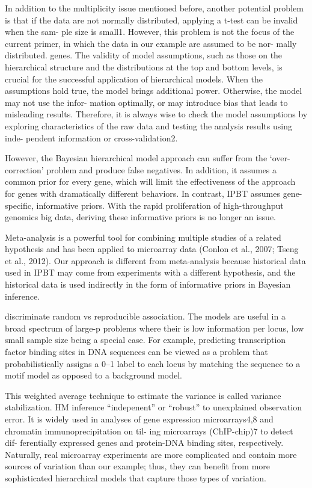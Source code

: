 \documentclass{article}
\begin{document}
In addition to the multiplicity issue mentioned before, another potential problem is that if the data are not normally distributed, applying a t-test can be invalid when the sam- ple size is small1. However, this problem is not the focus of the current primer, in which the data in our example are assumed to be nor- mally distributed.
genes. The validity of model assumptions, such as those on the hierarchical structure and the distributions at the top and bottom levels, is crucial for the successful application of hierarchical models. When the assumptions hold true, the model brings additional power. Otherwise, the model may not use the infor- mation optimally, or may introduce bias that leads to misleading results. Therefore, it is always wise to check the model assumptions by exploring characteristics of the raw data and testing the analysis results using inde- pendent information or cross-validation2.

However, the Bayesian hierarchical model approach can suffer from the ‘over-correction’ problem and produce false negatives. In addition, it assumes a common prior for every gene, which will limit the effectiveness of the approach for genes with dramatically different behaviors. In contrast, IPBT assumes gene-specific, informative priors. With the rapid proliferation of high-throughput genomics big data, deriving these informative priors is no longer an issue.

Meta-analysis is a powerful tool for combining multiple studies of a related hypothesis and has been applied to microarray data (Conlon et al., 2007; Tseng et al., 2012). Our approach is different from meta-analysis because historical data used in IPBT may come from experiments with a different hypothesis, and the historical data is used indirectly in the form of informative priors in Bayesian inference.

discriminate random vs reproducible association.
The models are useful in a broad spectrum of large-p problems where their is low information per locus, low small sample size being a special case. For example, predicting transcription factor binding sites in DNA sequences can be viewed as a problem that probabilistically assigns a 0–1 label to each locus by matching the sequence to a motif model as opposed to a background model.

This weighted average technique to estimate the variance is called variance stabilization. HM inference ``indepenent'' or ``robust'' to unexplained observation error. It is widely used in analyses of gene expression microarrays4,8 and chromatin immunoprecipitation on til- ing microarrays (ChIP-chip)7 to detect dif- ferentially expressed genes and protein-DNA binding sites, respectively. Naturally, real microarray experiments are more complicated and contain more sources of variation than our example; thus, they can benefit from more sophisticated hierarchical models that capture those types of variation.
\end{document}
